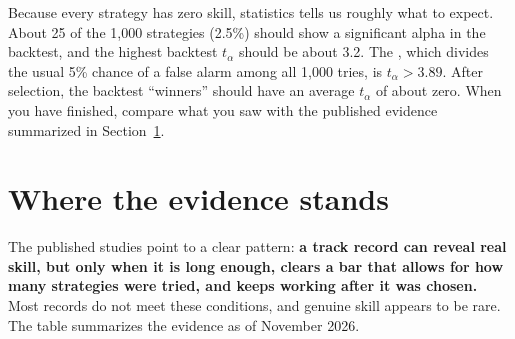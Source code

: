 Because every strategy has zero skill, statistics tells us roughly what to expect. About 25 of the 1,000 strategies (2.5\%) should show a significant alpha in the backtest, and the highest backtest $t_\alpha$ should be about 3.2. The , which divides the usual 5\% chance of a false alarm among all 1,000 tries, is $t_\alpha > 3.89$. After selection, the backtest ``winners'' should have an average $t_\alpha$ of about zero. When you have finished, compare what you saw with the published evidence summarized in Section~\ref{sec:01-verdict}.

\section{Where the evidence stands}
\label{sec:01-verdict}

The published studies point to a clear pattern: \textbf{a track record can reveal real skill, but only when it is long enough, clears a bar that allows for how many strategies were tried, and keeps working after it was chosen.} Most records do not meet these conditions, and genuine skill appears to be rare. The table summarizes the evidence as of November 2026.

